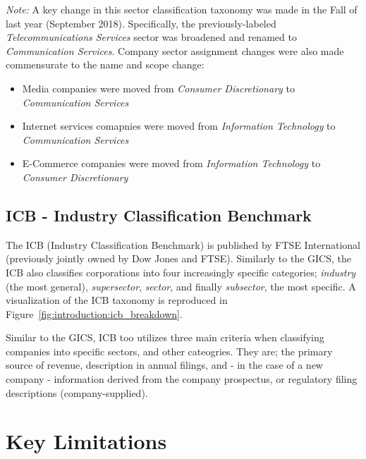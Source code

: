 \documentclass[../main.tex]{subfiles}
\begin{document}
\textit{Note:} A key change in this sector classification taxonomy was made in the Fall of last year (September 2018). Specifically, the previously-labeled \textit{Telecommunications Services} sector was broadened and renamed to \textit{Communication Services}. Company sector assignment changes were also made commensurate to the name and scope change:

\begin{itemize}
    \item Media companies were moved from \textit{Consumer Discretionary} to \textit{Communication Services}
    \item Internet services comapnies were moved from \textit{Information Technology} to \textit{Communication Services}
    \item E-Commerce companies were moved from \textit{Information Technology} to \textit{Consumer Discretionary}
\end{itemize}

\subsection{ICB - Industry Classification Benchmark}

The ICB (Industry Classification Benchmark) is published by FTSE International (previously jointly owned by Dow Jones and FTSE). Similarly to the GICS, the ICB also classifies corporations into four increasingly specific categories; \textit{industry} (the most general), \textit{supersector}, \textit{sector}, and finally \textit{subsector}, the most specific. A visualization of the ICB taxonomy is reproduced in Figure~\ref{fig:introduction:icb_breakdown}.


Similar to the GICS, ICB too utilizes three main criteria when classifying companies into specific sectors, and other cateogries. They are; the primary source of revenue, description in annual filings, and - in the case of a new company - information derived from the company prospectus, or regulatory filing descriptions (company-supplied).


\section{Key Limitations} \label{introduction:key_limitations}
\end{document}
